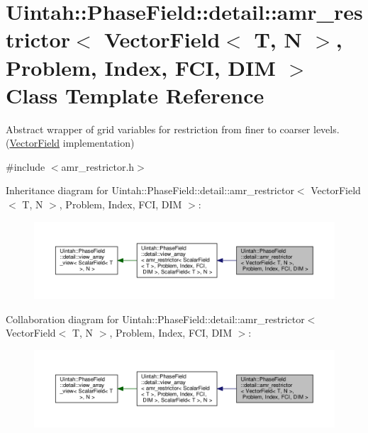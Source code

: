 \hypertarget{classUintah_1_1PhaseField_1_1detail_1_1amr__restrictor_3_01VectorField_3_01T_00_01N_01_4_00_01Pre7f2e99a4fbf25ff00717d25c8580b1a}{}\section{Uintah\+:\+:Phase\+Field\+:\+:detail\+:\+:amr\+\_\+restrictor$<$ Vector\+Field$<$ T, N $>$, Problem, Index, F\+CI, D\+IM $>$ Class Template Reference}
\label{classUintah_1_1PhaseField_1_1detail_1_1amr__restrictor_3_01VectorField_3_01T_00_01N_01_4_00_01Pre7f2e99a4fbf25ff00717d25c8580b1a}


Abstract wrapper of grid variables for restriction from finer to coarser levels. (\hyperlink{structUintah_1_1PhaseField_1_1VectorField}{Vector\+Field} implementation)  




{\ttfamily \#include $<$amr\+\_\+restrictor.\+h$>$}



Inheritance diagram for Uintah\+:\+:Phase\+Field\+:\+:detail\+:\+:amr\+\_\+restrictor$<$ Vector\+Field$<$ T, N $>$, Problem, Index, F\+CI, D\+IM $>$\+:\nopagebreak
\begin{figure}[H]
\begin{center}
\leavevmode
\includegraphics[width=350pt]{classUintah_1_1PhaseField_1_1detail_1_1amr__restrictor_3_01VectorField_3_01T_00_01N_01_4_00_01Prd14088bb03c51f5baa253b23a196d0e2}
\end{center}
\end{figure}


Collaboration diagram for Uintah\+:\+:Phase\+Field\+:\+:detail\+:\+:amr\+\_\+restrictor$<$ Vector\+Field$<$ T, N $>$, Problem, Index, F\+CI, D\+IM $>$\+:\nopagebreak
\begin{figure}[H]
\begin{center}
\leavevmode
\includegraphics[width=350pt]{classUintah_1_1PhaseField_1_1detail_1_1amr__restrictor_3_01VectorField_3_01T_00_01N_01_4_00_01Pr128d8728dd04fc640a9cf08402c46e84}
\end{center}
\end{figure}
